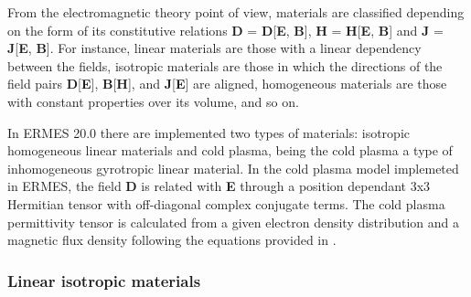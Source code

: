 From the electromagnetic theory point of view, materials are classified depending on the form of its constitutive relations \textbf{D} = \textbf{D}[\textbf{E}, \textbf{B}], \textbf{H} = \textbf{H}[\textbf{E}, \textbf{B}] and \textbf{J} = \textbf{J}[\textbf{E}, \textbf{B}]. For instance, linear materials are those with a linear dependency between the fields, isotropic materials are those in which the directions of the field pairs \textbf{D}[\textbf{E}], \textbf{B}[\textbf{H}], and \textbf{J}[\textbf{E}] are aligned, homogeneous materials are those with constant properties over its volume, and so on. 

In ERMES 20.0 there are implemented two types of materials: isotropic homogeneous linear materials and cold plasma, being the cold plasma a type of inhomogeneous gyrotropic linear material. In the cold plasma model implemeted in ERMES, the field \textbf{D} is related with \textbf{E} through a position dependant 3x3 Hermitian tensor with off-diagonal complex conjugate terms. The cold plasma permittivity tensor is calculated from a given electron density distribution and a magnetic flux density following the equations provided in \cite{Swanson}.

\subsubsection{Linear isotropic materials}\label{ILConstitutiveRelations}


